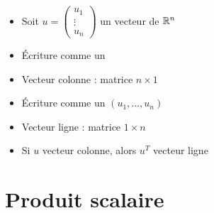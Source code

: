 \begin{frame}

\begin{itemize}[<+->]\setlength{\itemsep}{6pt}
  \item Soit $u = \left(\begin{smallmatrix} u_1\\ \vdots \\ u_n \end{smallmatrix}\right)$ 
un vecteur de $\mathbb{R}^n$
  
  \item \'Ecriture comme un 
  
  \item Vecteur colonne : matrice $n\times 1$ 
  
  \item \'Ecriture comme un  $(u_1,\dots,u_n)$
 
  \item Vecteur ligne : matrice $1\times n$
  
  \item Si $u$ vecteur colonne, alors $u^T$ vecteur ligne
\end{itemize}
\end{frame}



\section{Produit scalaire}


